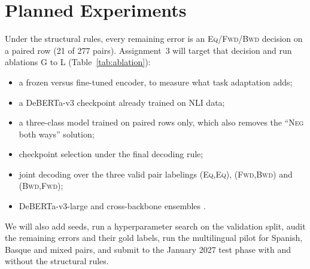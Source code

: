 \documentclass[10pt,a4paper,twocolumn]{article}
\newcommand{\Eq}{\textsc{Eq}}
\newcommand{\Fwd}{\textsc{Fwd}}
\newcommand{\Bwd}{\textsc{Bwd}}
\newcommand{\Neg}{\textsc{Neg}}
\begin{document}
\section{Planned Experiments}
\label{sec:plan}

Under the structural rules, every remaining error is an \Eq/\Fwd/\Bwd{} decision on a paired row (21 of 277 pairs). Assignment~3 will target that decision and run ablations G to L (Table~\ref{tab:ablation}):
\begin{itemize}\setlength\itemsep{0pt}
\item a frozen versus fine-tuned encoder, to measure what task adaptation adds;
\item a DeBERTa-v3 checkpoint already trained on NLI data;
\item a three-class model trained on paired rows only, which also removes the ``\Neg{} both ways'' solution;
\item checkpoint selection under the final decoding rule;
\item joint decoding over the three valid pair labelings (\Eq,\Eq), (\Fwd,\Bwd) and (\Bwd,\Fwd);
\item DeBERTa-v3-large and cross-backbone ensembles \citep{lakshminarayanan2017simple}.
\end{itemize}
We will also add seeds, run a hyperparameter search on the validation split, audit the remaining errors and their gold labels, run the multilingual pilot for Spanish, Basque and mixed pairs, and submit to the January 2027 test phase with and without the structural rules.



\end{document}
